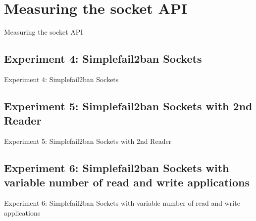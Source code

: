 \section{Measuring the socket API}
Measuring the socket API

\subsection{Experiment 4: Simplefail2ban Sockets}
Experiment 4: Simplefail2ban Sockets

\subsection{Experiment 5: Simplefail2ban Sockets with 2nd Reader}
Experiment 5: Simplefail2ban Sockets with 2nd Reader

\subsection{Experiment 6: Simplefail2ban Sockets with variable number of read and write applications}
Experiment 6: Simplefail2ban Sockets with variable number of read and write applications